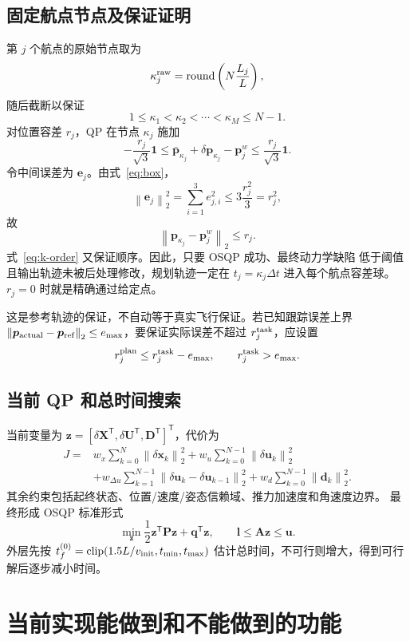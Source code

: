 \documentclass[UTF8,a4paper,11pt]{ctexart}
\newcommand{\clipop}{\operatorname{clip}}
\newcommand{\nTwo}[1]{\left\lVert#1\right\rVert_2}
\begin{document}
\subsection{固定航点节点及保证证明}

第 $j$ 个航点的原始节点取为
\[
 \kappa_j^{\rm raw}=\operatorname{round}\left(N\frac{L_j}{L}\right),
\]
随后截断以保证
\[
 1\leq\kappa_1<\kappa_2<\cdots<\kappa_M\leq N-1.
 \label{eq:k-order}
\]
对位置容差 $r_j$，QP 在节点 $\kappa_j$ 施加
\begin{equation}
 -\frac{r_j}{\sqrt3}\bm1\leq
 \bar{\bm p}_{\kappa_j}+\delta\bm p_{\kappa_j}-\bm p_j^w
 \leq\frac{r_j}{\sqrt3}\bm1.
 \label{eq:box}
\end{equation}
令中间误差为 $\bm e_j$。由式~\eqref{eq:box}，
\[
 \nTwo{\bm e_j}^2=\sum_{i=1}^{3}e_{j,i}^2
 \leq3\frac{r_j^2}{3}=r_j^2,
\]
故
\begin{equation}
 \nTwo{\bm p_{\kappa_j}-\bm p_j^w}\leq r_j.
 \label{eq:guarantee}
\end{equation}
式~\eqref{eq:k-order} 又保证顺序。因此，只要 OSQP 成功、最终动力学缺陷
低于阈值且输出轨迹未被后处理修改，规划轨迹一定在
$t_j=\kappa_j\Delta t$ 进入每个航点容差球。$r_j=0$ 时就是精确通过给定点。

这是参考轨迹的保证，不自动等于真实飞行保证。若已知跟踪误差上界
$\nTwo{\bm p_{\rm actual}-\bm p_{\rm ref}}\leq e_{\max}$，要保证实际误差不超过
$r_j^{\rm task}$，应设置
\[
 r_j^{\rm plan}\leq r_j^{\rm task}-e_{\max},\qquad
 r_j^{\rm task}>e_{\max}.
\]

\subsection{当前 QP 和总时间搜索}

当前变量为 $\bm z=[\delta\bm X^\mathsf T,\delta\bm U^\mathsf T,
\bm D^\mathsf T]^\mathsf T$，代价为
\begin{align}
 J={}&w_x\sum_{k=0}^{N}\nTwo{\delta\bm x_k}^2
 +w_u\sum_{k=0}^{N-1}\nTwo{\delta\bm u_k}^2\\
 &+w_{\Delta u}\sum_{k=1}^{N-1}
 \nTwo{\delta\bm u_k-\delta\bm u_{k-1}}^2
 +w_d\sum_{k=0}^{N-1}\nTwo{\bm d_k}^2.
\end{align}
其余约束包括起终状态、位置/速度/姿态信赖域、推力加速度和角速度边界。
最终形成 OSQP 标准形式
\[
 \min_{\bm z}\frac12\bm z^\mathsf T\bm P\bm z+\bm q^\mathsf T\bm z,
 \qquad \bm l\leq\bm A\bm z\leq\bm u.
\]
外层先按 $t_f^{(0)}=\clipop(1.5L/v_{\rm init},t_{\min},t_{\max})$
估计总时间，不可行则增大，得到可行解后逐步减小时间。

\section{当前实现能做到和不能做到的功能}
\end{document}
